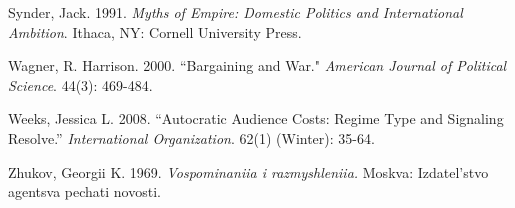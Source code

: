 \documentclass[11pt,]{article}
\begin{document}
\begin{thebibliography}{}
\bibitem{} Synder, Jack.  1991.  \textit{Myths of Empire: Domestic Politics and International Ambition}.  Ithaca, NY: Cornell University Press.

\bibitem{} Wagner, R. Harrison.  2000.  ``Bargaining and War."  \textit{American Journal of Political Science}.  44(3): 469-484.

\bibitem{} Weeks, Jessica L. 2008.  ``Autocratic Audience Costs: Regime Type and Signaling Resolve.'' \textit{International Organization}.  62(1) (Winter):  35-64.

\bibitem{} Zhukov, Georgii K.  1969.  \textit{Vospominaniia i razmyshleniia.}  Moskva:  Izdatel’stvo agentsva pechati novosti.

\end{thebibliography}
\end{document}
